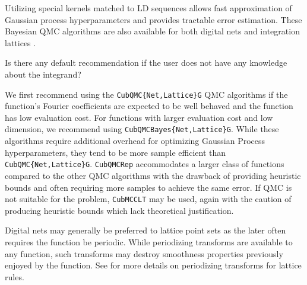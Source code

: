 \documentclass{article}[12pt]
\newcommand{\JRComment}[1]{{\color{violet}#1}}
\begin{document}
\begin{description}
    Utilizing special kernels matched to LD sequences allows fast approximation of Gaussian process hyperparameters and provides tractable error estimation. These Bayesian QMC algorithms are also available for both digital nets \cite{cubqmcbayes_thesis} and integration lattices  \cite{cubqmcbayeslattice}. 
\end{description}

\JRComment{Is there any default recommendation if the user does not have any knowledge about the integrand?}

We first recommend using the  \texttt{CubQMC\{Net,Lattice\}G} QMC algorithms if the function's Fourier coefficients are expected to be well behaved and the function has low evaluation cost. For functions with larger evaluation cost and low dimension, we recommend using  \texttt{CubQMCBayes\{Net,Lattice\}G}. While these algorithms require additional overhead for optimizing Gaussian Process hyperparameters, they tend to be more sample efficient than \texttt{CubQMC\{Net,Lattice\}G}. \texttt{CubQMCRep} accommodates a larger class of functions compared to the other QMC algorithms with the drawback of providing heuristic bounds and often requiring more samples to achieve the same error. If QMC is not suitable for the problem, \texttt{CubMCCLT} may be used, again with the caution of producing heuristic bounds which lack theoretical justification.

Digital nets may generally be preferred to lattice point sets as the later often requires the function be periodic. While periodizing transforms are available to any function, such transforms may destroy smoothness properties previously enjoyed by the function. See \cite[Chapter 16]{mcbook} for more details on periodizing transforms for lattice rules.

\end{document}
